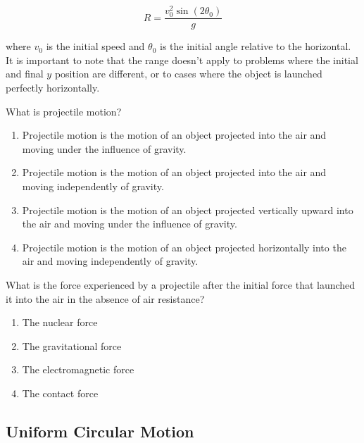 \documentclass[main-physics.tex]{subfiles}
\begin{document}
\begin{equation} \label{GqvaN1}
    R = \frac{v_0^2 \sin{(2\theta_0)}}{g}
\end{equation}

where $v_0$ is the initial speed and $\theta_0$ is the initial angle relative to the horizontal. It is important to note that the range doesn't apply to problems where the initial and final $y$ position are different, or to cases where the object is launched perfectly horizontally.

\begin{exercise}
    What is projectile motion?
    
    \begin{enumerate}[label=\Alph*.]
        \item Projectile motion is the motion of an object projected into the air and moving under the influence of gravity.
        \item Projectile motion is the motion of an object projected into the air and moving independently of gravity.
        \item Projectile motion is the motion of an object projected vertically upward into the air and moving under the influence of gravity.
        \item Projectile motion is the motion of an object projected horizontally into the air and moving independently of gravity.
    \end{enumerate}
\end{exercise}

\begin{exercise}
    What is the force experienced by a projectile after the initial force that launched it into the air in the absence of air resistance?

    \begin{enumerate}[label=\Alph*.]
        \item The nuclear force
        \item The gravitational force
        \item The electromagnetic force
        \item The contact force
    \end{enumerate}
\end{exercise}






\subsection{Uniform Circular Motion} \label{uPOucv}
\end{document}
